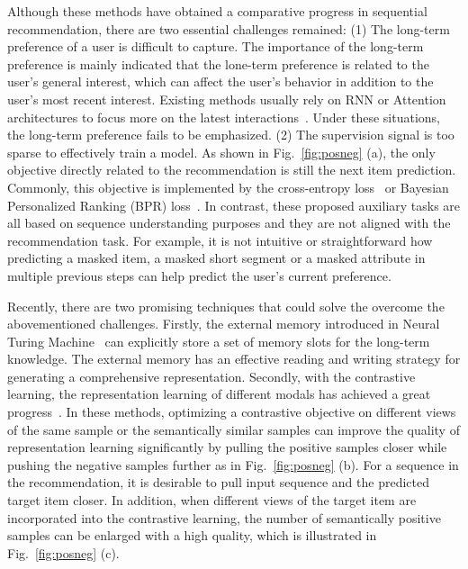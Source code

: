 \documentclass[conference]{IEEEtran}
\begin{document}
Although these methods have obtained a comparative progress in sequential recommendation, there are two essential challenges remained: (1) The long-term preference of a user is difficult to capture. The importance of the long-term preference is mainly indicated that the lone-term preference is related to the user's general interest, which can affect the user's behavior in addition to the user's most recent interest. Existing methods usually rely on RNN or Attention architectures to focus more on the latest interactions~\cite{gru4rec,sasrec}. Under these situations, the long-term preference fails to be emphasized. (2) The supervision signal is too sparse to effectively train a model. As shown in Fig.~\ref{fig:posneg} (a), the only objective directly related to the recommendation is still the next item prediction. Commonly, this objective is implemented by the cross-entropy loss~\cite{bert4rec} or Bayesian Personalized Ranking (BPR) loss~\cite{gru4rec}. In contrast, these proposed auxiliary tasks are all based on sequence understanding purposes and they are not aligned with the recommendation task. For example, it is not intuitive or straightforward how predicting a masked item, a masked short segment or a masked attribute in multiple previous steps can help predict the user's current preference.

Recently, there are two promising techniques that could solve the overcome the abovementioned challenges. Firstly, the external memory introduced in Neural Turing Machine~\cite{ntm} can explicitly store a set of memory slots for the long-term knowledge. The external memory has an effective reading and writing strategy for generating a comprehensive representation. Secondly, with the contrastive learning, the representation learning of different modals has achieved a great progress~\cite{moco,simclr,cpc,ecpc,deepinfomax,memdpc,coclr}. In these methods, optimizing a contrastive objective on different views of the same sample or the semantically similar samples can improve the quality of representation learning significantly by pulling the positive samples closer while pushing the negative samples further as in Fig.~\ref{fig:posneg} (b). For a sequence in the recommendation, it is desirable to pull input sequence and the predicted target item closer. In addition, when different views of the target item are incorporated into the contrastive learning, the number of semantically positive samples can be enlarged with a high quality, which is illustrated in Fig.~\ref{fig:posneg} (c).
\end{document}
